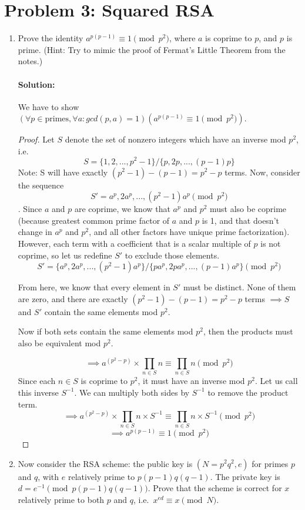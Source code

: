 \documentclass[11pt, notitlepage]{report}
\newcommand{\Question}[1]{\newpage\section{#1}}
\newenvironment{solution}{\paragraph{Solution:}}{\hfill}
\begin{document}
\Question{Problem 3: Squared RSA}

\begin{enumerate}[label=(\alph*)]
  \item Prove the identity $a^{p(p - 1)} \equiv 1 \pmod{p^2}$, where $a$ is coprime to $p$, and $p$ is prime. (Hint: Try to mimic the proof of Fermat's Little Theorem from the notes.)
	\begin{solution}
		We have to show $(\forall p\in \text{primes},\forall a : gcd(p,a)=1)(a^{p(p - 1)} \equiv 1 \pmod{p^2})$.
		\begin{proof}
			Let $S$ denote the set of nonzero integers which have an inverse mod $p^2$, i.e. \[S=\{1,2,...,p^2-1\} / \{p, 2p , ...,(p-1)p\} \] Note: S will have exactly $(p^2-1) - (p-1) = p^2-p$ terms. Now, consider the sequence \[S'= a^p,2a^p,...,(p^2-1)a^p \pmod{p^2}\]. Since $a$ and $p$ are coprime, we know that $a^p$ and $p^2$ must also be coprime (because greatest common prime factor of $a$ and $p$ is 1, and that doesn't change in $a^p$ and $p^2$, and all other factors have unique prime factorization). However, each term with a coefficient that is a scalar multiple of $p$ is not coprime, so let us redefine $S'$ to exclude those elements. \[S'= \{a^p,2a^p,...,(p^2-1)a^p\}/\{pa^p,2pa^p,...,(p-1)a^p\} \pmod{p^2}\]
			
			From here, we know that every element in $S'$ must be distinct. None of them are zero, and there are exactly $(p^2-1) - (p-1) = p^2-p$ terms $\implies S$ and $S'$ contain the same elements mod $p^2$.
			
			Now if both sets contain the same elements mod $p^2$, then the products must also be equivalent mod $p^2$.
			
			\[\implies a^{(p^2-p)} \times \prod_{n\in S}{n} \equiv \prod_{n\in S}{n} \pmod{p^2} \]
			Since each $n\in S$ is coprime to $p^2$, it must have an inverse mod $p^2$. Let us call this inverse $S^{-1}$. We can multiply both sides by $S^{-1}$ to remove the product term.
			\[\implies a^{(p^2-p)} \times \prod_{n\in S}{n} \times S^{-1} \equiv \prod_{n\in S}{n} \times S^{-1} \pmod{p^2} \]
			\[\implies a^{p(p-1)} \equiv 1 \pmod{p^2} \]

		\end{proof}
	\end{solution}
	  \newpage

  \item Now consider the RSA scheme: the public key is $(N = p^2 q^2, e)$ for primes $p$ and $q$, with $e$ relatively prime to $p(p-1)q(q-1)$. The private key is $d = e^{-1} \pmod{p(p-1)q(q-1)}$.
  Prove that the scheme is correct for $x$ relatively prime to both $p$ and $q$, i.e.\ $x^{ed} \equiv x \pmod{N}$.
 

\end{enumerate}
\end{document}

